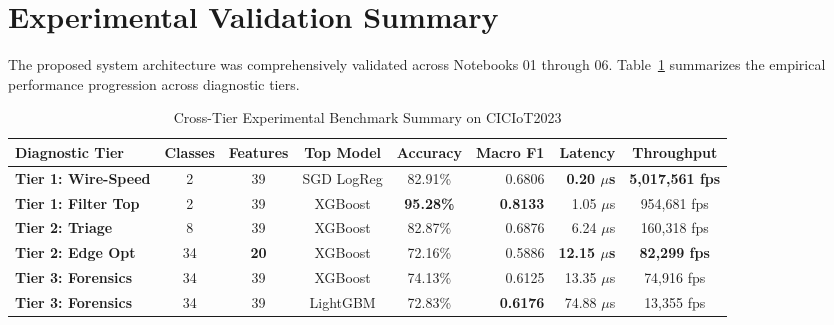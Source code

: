 \documentclass[12pt,a4paper]{report}
\begin{document}
\section{Experimental Validation Summary}
The proposed system architecture was comprehensively validated across Notebooks 01 through 06. Table~\ref{tab:master_benchmark} summarizes the empirical performance progression across diagnostic tiers.

\begin{table}[ht]
\centering
\caption{Cross-Tier Experimental Benchmark Summary on CICIoT2023}
\label{tab:master_benchmark}
\small
\begin{tabular}{@{}lccccrrc@{}}
\toprule
\textbf{Diagnostic Tier} & \textbf{Classes} & \textbf{Features} & \textbf{Top Model} & \textbf{Accuracy} & \textbf{Macro F1} & \textbf{Latency} & \textbf{Throughput} \\
\midrule
\textbf{Tier 1: Wire-Speed} & 2 & 39 & SGD LogReg & 82.91\% & 0.6806 & \textbf{0.20 $\mu$s} & \textbf{5,017,561 fps} \\
\textbf{Tier 1: Filter Top} & 2 & 39 & XGBoost & \textbf{95.28\%} & \textbf{0.8133} & 1.05 $\mu$s & 954,681 fps \\
\textbf{Tier 2: Triage} & 8 & 39 & XGBoost & 82.87\% & 0.6876 & 6.24 $\mu$s & 160,318 fps \\
\textbf{Tier 2: Edge Opt} & 34 & \textbf{20} & XGBoost & 72.16\% & 0.5886 & \textbf{12.15 $\mu$s} & \textbf{82,299 fps} \\
\textbf{Tier 3: Forensics} & 34 & 39 & XGBoost & 74.13\% & 0.6125 & 13.35 $\mu$s & 74,916 fps \\
\textbf{Tier 3: Forensics} & 34 & 39 & LightGBM & 72.83\% & \textbf{0.6176} & 74.88 $\mu$s & 13,355 fps \\
\bottomrule
\end{tabular}
\end{table}
\end{document}
